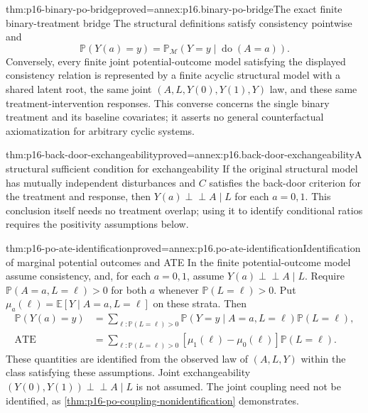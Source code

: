\begin{hbtheorem}{thm:p16-binary-po-bridge}{proved=annex:p16.binary-po-bridge}{The exact finite binary-treatment bridge}
The structural definitions satisfy consistency pointwise and
\[
 \mathbb P(Y(a)=y)
  =\mathbb P_{\mathcal M}(Y=y\mid\operatorname{do}(A=a)).
\]
Conversely, every finite joint potential-outcome model satisfying the
displayed consistency relation is represented by a finite acyclic
structural model with a shared latent root, the same joint
\((A,L,Y(0),Y(1),Y)\) law, and these same treatment-intervention
responses. This converse concerns the single binary treatment and
its baseline covariates; it asserts no general counterfactual
axiomatization for arbitrary cyclic systems.
\end{hbtheorem}

\begin{hbcorollary}{thm:p16-back-door-exchangeability}{proved=annex:p16.back-door-exchangeability}{A structural sufficient condition for exchangeability}
If the original structural model has mutually independent disturbances
and \(C\) satisfies the back-door criterion for the treatment and
response, then \(Y(a)\mathrel{\perp\!\!\!\perp}A\mid L\)
for each \(a=0,1\). This conclusion itself needs no treatment
overlap; using it to identify conditional ratios requires the
positivity assumptions below.
\end{hbcorollary}

\begin{hbtheorem}{thm:p16-po-ate-identification}{proved=annex:p16.po-ate-identification}{Identification of marginal potential outcomes and ATE}
In the finite potential-outcome model assume consistency, and, for
each \(a=0,1\), assume
\(Y(a)\mathrel{\perp\!\!\!\perp}A\mid L\).
Require \(\mathbb P(A=a,L=\ell)>0\) for both \(a\) whenever
\(\mathbb P(L=\ell)>0\). Put
\(\mu_a(\ell)=\mathbb E[Y\mid A=a,L=\ell]\) on these strata.
Then
\[
\begin{aligned}
 \mathbb P(Y(a)=y)
  &=\sum_{\ell:\mathbb P(L=\ell)>0}
       \mathbb P(Y=y\mid A=a,L=\ell)\mathbb P(L=\ell),\\
 \operatorname{ATE}
  &=\sum_{\ell:\mathbb P(L=\ell)>0}
       [\mu_1(\ell)-\mu_0(\ell)]\mathbb P(L=\ell).
\end{aligned}
\]
These quantities are identified from the observed law of \((A,L,Y)\)
within the class satisfying these assumptions. Joint exchangeability
\((Y(0),Y(1))\mathrel{\perp\!\!\!\perp}A\mid L\) is not
assumed. The joint coupling need not be identified, as
\cref{thm:p16-po-coupling-nonidentification} demonstrates.
\end{hbtheorem}

